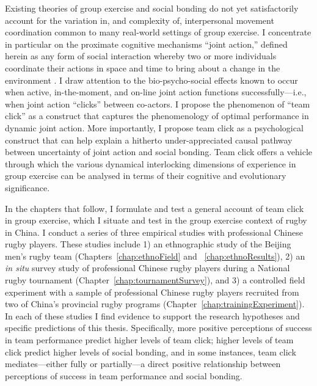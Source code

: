\begin{CJK}{UTF8}{gbsn}
Existing theories of group exercise and social bonding do not yet satisfactorily account for the variation in, and complexity of, interpersonal movement coordination common to many real-world settings of group exercise.  I concentrate in particular on the proximate cognitive mechanisms  ``joint action,'' defined herein as any form of social interaction whereby two or more individuals coordinate their actions in space and time to bring about a change in the environment \citep{Sebanz2006}.  I draw attention to the bio-psycho-social effects known to occur when active, in-the-moment, and on-line joint action functions successfully---i.e., when joint action ``clicks'' between co-actors.  I propose the phenomenon of ``team click'' as a construct that captures the phenomenology of optimal performance in dynamic joint action.  More importantly, I propose team click as a psychological construct that can help explain a hitherto under-appreciated causal pathway between uncertainty of joint action and social bonding.  Team click offers a vehicle through which the various dynamical interlocking dimensions of experience in group exercise can be analysed in terms of their cognitive and evolutionary significance.


In the chapters that follow, I formulate and test a general account of team click in group exercise, which I situate and test in the group exercise context of rugby in China.  I conduct a series of three empirical studies with professional Chinese rugby players.  These studies include 1) an ethnographic study of the Beijing men's rugby team (Chapters~\ref{chap:ethnoField} and ~\ref{chap:ethnoResults}), 2) an \textit{in situ} survey study of professional Chinese rugby players during a National rugby tournament (Chapter~\ref{chap:tournamentSurvey}), and 3) a controlled field experiment with a sample of professional Chinese rugby players recruited from two of China's provincial rugby programs (Chapter~\ref{chap:trainingExperiment}).  In each of these studies I find evidence to support the research hypotheses and specific predictions of this thesis.  Specifically, more positive perceptions of success in team performance predict higher levels of team click; higher levels of team click predict higher levels of social bonding, and in some instances, team click mediates---either fully or partially---a direct positive relationship between perceptions of success in team performance and social bonding.


\end{CJK}
